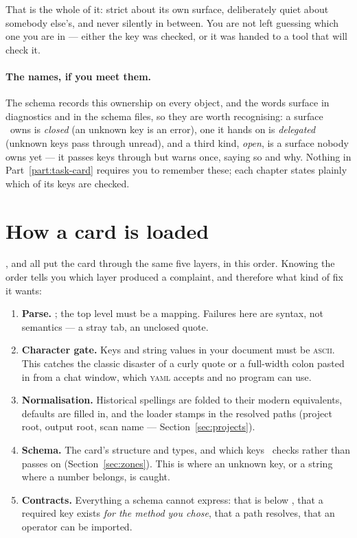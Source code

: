 That is the whole of it: strict about its own surface, deliberately quiet about somebody
else's, and never silently in between. You are not left guessing which one you are in ---
either the key was checked, or it was handed to a tool that will check it.

\paragraph{The names, if you meet them.} The schema records this ownership on every
object, and the words surface in diagnostics and in the schema files, so they are worth
recognising: a surface \Jtwo\ owns is \emph{closed} (an unknown key is an error), one it
hands on is \emph{delegated} (unknown keys pass through unread), and a third kind,
\emph{open}, is a surface nobody owns yet --- it passes keys through but warns once,
saying so and why. Nothing in Part~\ref{part:task-card} requires you to remember these;
each chapter states plainly which of its keys are checked.

\section{How a card is loaded}
\label{sec:card-loading}

,  and  all put the card through
the same five layers, in this order. Knowing the order tells you which layer produced a
complaint, and therefore what kind of fix it wants:

\begin{enumerate}
  \item \textbf{Parse.} ; the top level must be a mapping.
        Failures here are syntax, not semantics --- a stray tab, an unclosed quote.
  \item \textbf{Character gate.} Keys and string values in your document must be
        \textsc{ascii}. This catches the classic disaster of a curly quote or a full-width
        colon pasted in from a chat window, which \textsc{yaml} accepts and no program
        can use.
  \item \textbf{Normalisation.} Historical spellings are folded to their modern
        equivalents, defaults are filled in, and the loader stamps in the resolved paths
        (project root, output root, scan name --- Section~\ref{sec:projects}).
  \item \textbf{Schema.} The card's structure and types, and which keys \Jtwo\ checks
        rather than passes on (Section~\ref{sec:zones}). This is where an unknown key, or
        a string where a number belongs, is caught.
  \item \textbf{Contracts.} Everything a schema cannot express: that  is below
        , that a required key exists \emph{for the method you chose}, that a
        path resolves, that an operator can be imported.
\end{enumerate}

